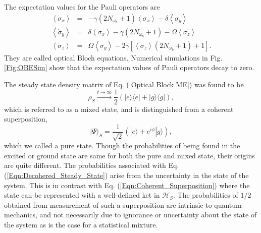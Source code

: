 %
\par
%
The expectation values for the Pauli operators are
\begin{eqnarray}
\left\langle \dot{\sigma}_x \right\rangle & = & - \gamma \left( 2 N_{\omega_b} + 1 \right) \left\langle \sigma_x \right\rangle - \delta \left\langle \sigma_y \right\rangle \nonumber \\
\left\langle \dot{\sigma}_y \right\rangle & = & \delta \left\langle \sigma_{x} \right\rangle - \gamma \left( 2 N_{\omega_b} + 1 \right) - \Omega \left\langle \sigma_z \right\rangle \nonumber \\
\left\langle \dot{\sigma}_z \right\rangle & = & \Omega \left\langle \sigma_y \right\rangle - 2 \gamma [ \left\langle \sigma_z \right\rangle ( 2 N_{\omega_{b}} + 1 ) + 1  ].
\end{eqnarray}
%
They are called optical Bloch equations. Numerical simulations in Fig. \ref{Fig:OBESim} show that the expectation values of Pauli operators decay to zero. 
%
\par
%
The steady state density matrix of Eq. (\ref{Optical Block ME}) was found to be
\begin{equation}\label{Eqn:Decohered_Steady_State}
\rho_S \xrightarrow{t\rightarrow\infty} \frac{1}{2} \left( | e \rangle \langle e | + | g \rangle \langle g | \right),
\end{equation}
which is referred to as a mixed state, and is distinguished from 
a coherent superposition,
\begin{equation}\label{Eqn:Coherent_Superposition}
|\Psi\rangle_{S} = \frac{1}{\sqrt{2}}\left( |e \rangle + e^{i\phi} | g \rangle \right),
\end{equation}
which we called a pure state. Though the probabilities of being found in the excited or ground state are same for both the pure and mixed state, their origins are quite different. The probabilities associated with Eq. (\ref{Eqn:Decohered_Steady_State}) arise from the uncertainty in the state of the system. This is in contrast with Eq. (\ref{Eqn:Coherent_Superposition}) where the state can be represented with a well-defined ket in $\mathcal{H}_{S}$. The probabilities of $1/2$ obtained from measurement of such a superposition are intrinsic to quantum mechanics, and not necessarily due to ignorance or uncertainty about the state of the system as is the case for a statistical mixture. 

